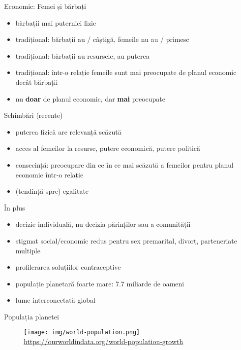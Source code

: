 \documentclass{simple}
\begin{document}
\begin{frame}{Economic: Femei și bărbați}
  \begin{itemize}
    \pause
    \item bărbații mai puternici fizic
    \pause
    \item tradițional: bărbații au / câștigă, femeile nu au / primesc
    \pause
    \item tradițional: bărbații au resursele, au puterea
    \pause
    \item tradițional: într-o relație femeile sunt mai preocupate de planul economic decât bărbații
    \pause
    \item nu \textbf{doar} de planul economic, dar \textbf{mai} preocupate
  \end{itemize}
\end{frame}

\begin{frame}{Schimbări (recente)}
  \begin{itemize}
    \pause
    \item puterea fizică are relevanță scăzută
    \pause
    \item acces al femeilor la resurse, putere economică, putere politică
    \pause
    \item consecință: preocupare din ce în ce mai scăzută a femeilor pentru planul economic într-o relație
    \pause
    \item (tendință spre) egalitate
  \end{itemize}
\end{frame}

\begin{frame}{În plus}
  \begin{itemize}
    \pause
    \item decizie individuală, nu decizia părinților sau a comunității
    \pause
    \item stigmat social/economic redus pentru sex premarital, divorț, parteneriate multiple
    \pause
    \item profilerarea soluțiilor contraceptive
    \pause
    \item populație planetară foarte mare: 7.7 miliarde de oameni
    \pause
    \item lume interconectată global
  \end{itemize}
\end{frame}

\begin{frame}{Populația planetei}
  \begin{figure}[!htbp]
    \centering
    \texttt{[image: img/world-population.png]} \\
    \tiny{\url{https://ourworldindata.org/world-population-growth}}
  \end{figure}
\end{frame}
\end{document}
